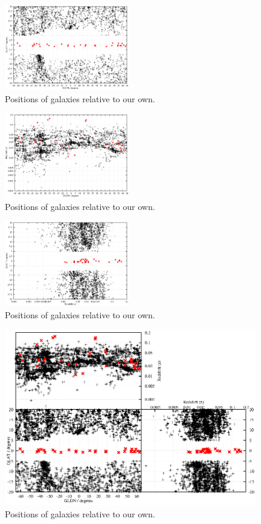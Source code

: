 \documentclass[times,usenatbib]{mn2e}
\begin{document}
\begin{figure}
\includegraphics[width=0.48\textwidth]{./figures/2MRS_latlon.eps}
\caption{Positions of galaxies relative to our own.}
\label{2mrs}
\end{figure}

\begin{figure}
\includegraphics[width=0.48\textwidth]{./figures/2MRS_zlon.eps}
\caption{Positions of galaxies relative to our own.}
\label{2mrsz}
\end{figure}

\begin{figure}
\includegraphics[width=0.48\textwidth]{./figures/2MRS_zlat.eps}
\caption{Positions of galaxies relative to our own.}
\label{2mrsz2}
\end{figure}

\begin{figure}
\includegraphics[width=0.98\textwidth]{./figures/2MRS_All.eps}
\caption{Positions of galaxies relative to our own.}
\label{2mrs_all}
\end{figure}
\end{document}
